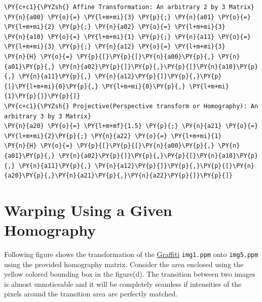 \documentclass[a4paper,11pt]{article}%
\begin{document}
\begin{tcolorbox}[breakable, size=fbox, boxrule=1pt, pad at break*=1mm,colback=cellbackground, colframe=cellborder]
\begin{Verbatim}[commandchars=\\\{\}]
\PY{c+c1}{\PYZsh{} Affine Transformation: An arbitrary 2 by 3 Matrix}
\PY{n}{a00} \PY{o}{=} \PY{l+m+mi}{3} \PY{p}{;} \PY{n}{a01} \PY{o}{=} \PY{l+m+mi}{2} \PY{p}{;} \PY{n}{a02} \PY{o}{=} \PY{l+m+mi}{3}
\PY{n}{a10} \PY{o}{=} \PY{l+m+mi}{1} \PY{p}{;} \PY{n}{a11} \PY{o}{=} \PY{l+m+mi}{3} \PY{p}{;} \PY{n}{a12} \PY{o}{=} \PY{l+m+mi}{3}
\PY{n}{H} \PY{o}{=} \PY{p}{[}\PY{p}{[}\PY{n}{a00}\PY{p}{,} \PY{n}{a01}\PY{p}{,} \PY{n}{a02}\PY{p}{]}\PY{p}{,}\PY{p}{[}\PY{n}{a10}\PY{p}{,} \PY{n}{a11}\PY{p}{,} \PY{n}{a12}\PY{p}{]}\PY{p}{,}\PY{p}{[}\PY{l+m+mi}{0}\PY{p}{,} \PY{l+m+mi}{0}\PY{p}{,} \PY{l+m+mi}{1}\PY{p}{]}\PY{p}{]}
\PY{c+c1}{\PYZsh{} Projective(Perspective transform or Homography): An arbitrary 3 by 3 Matrix}
\PY{n}{a20} \PY{o}{=} \PY{l+m+mf}{1.5} \PY{p}{;} \PY{n}{a21} \PY{o}{=} \PY{l+m+mi}{2}\PY{p}{;} \PY{n}{a22} \PY{o}{=} \PY{l+m+mi}{1}
\PY{n}{H} \PY{o}{=} \PY{p}{[}\PY{p}{[}\PY{n}{a00}\PY{p}{,} \PY{n}{a01}\PY{p}{,} \PY{n}{a02}\PY{p}{]}\PY{p}{,}\PY{p}{[}\PY{n}{a10}\PY{p}{,} \PY{n}{a11}\PY{p}{,} \PY{n}{a12}\PY{p}{]}\PY{p}{,}\PY{p}{[}\PY{n}{a20}\PY{p}{,}\PY{n}{a21}\PY{p}{,}\PY{n}{a22}\PY{p}{]}\PY{p}{]}
\end{Verbatim}
\end{tcolorbox}
\section{Warping Using a Given Homography}  

Following figure shows the transformation of the  \href{https://www.robots.ox.ac.uk/~vgg/data/affine/}{Graffiti} {\tt img1.ppm} onto {\tt img5.ppm} using the provided homography matrix. Consider the area enclosed using the yellow colored bounding box in the figure(d). The transition between two images is almost unnoticeable and it will be completely seamless if  intensities of the pixels around the transition area are perfectly matched.\\
\end{document}
